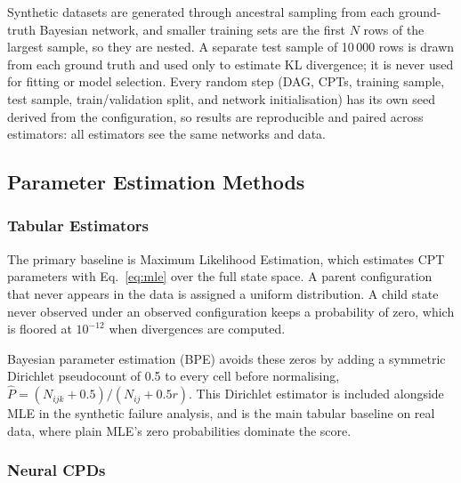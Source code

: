 \documentclass[a4paper,fleqn]{cas-dc}
\begin{document}
Synthetic datasets are generated through ancestral sampling from each ground-truth Bayesian network, and smaller training sets are the first $N$ rows of the largest sample, so they are nested. A separate test sample of 10\,000 rows is drawn from each ground truth and used only to estimate KL divergence; it is never used for fitting or model selection. Every random step (DAG, CPTs, training sample, test sample, train/validation split, and network initialisation) has its own seed derived from the configuration, so results are reproducible and paired across estimators: all estimators see the same networks and data.

\subsection{Parameter Estimation Methods}

\subsubsection{Tabular Estimators}

The primary baseline is Maximum Likelihood Estimation, which estimates CPT parameters with Eq.~\eqref{eq:mle} over the full state space. A parent configuration that never appears in the data is assigned a uniform distribution. A child state never observed under an observed configuration keeps a probability of zero, which is floored at $10^{-12}$ when divergences are computed.

Bayesian parameter estimation (BPE) avoids these zeros by adding a symmetric Dirichlet pseudocount of 0.5 to every cell before normalising, $\hat P = (N_{ijk}+0.5)/(N_{ij}+0.5r)$. This Dirichlet estimator is included alongside MLE in the synthetic failure analysis, and is the main tabular baseline on real data, where plain MLE's zero probabilities dominate the score.

\subsubsection{Neural CPDs}
\end{document}

